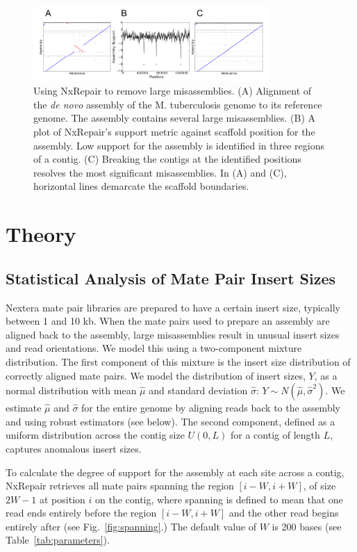 \begin{figure}
\centerline{\includegraphics[width=0.8\textwidth]{illumina/fig1_nxrepair.pdf}}
\caption{Using NxRepair to remove large misassemblies. (A) Alignment of the \textit{de novo} assembly of the M. tuberculosis genome to its reference genome. The assembly contains several large misassemblies. (B) A plot of NxRepair's support metric against scaffold position for the assembly. Low support for the assembly is identified in three regions of a contig. (C) Breaking the contigs at the identified positions resolves the most significant misassemblies. In (A) and (C), horizontal lines demarcate the scaffold boundaries.}\label{fig:NxRepair}
\end{figure}

\section{Theory}
\subsection*{Statistical Analysis of Mate Pair Insert Sizes}
Nextera mate pair libraries are prepared to have a certain insert size, typically between 1 and 10 kb. When the mate pairs used to prepare an assembly are aligned back to the assembly, large misassemblies result in unusual insert sizes and read orientations. We model this using a two-component mixture distribution. The first component of this mixture is the insert size distribution of correctly aligned mate pairs.  We model the distribution of insert sizes, $Y$, as a normal distribution with mean $\hat{\mu}$ and standard deviation $\hat{\sigma}$: $Y \sim N(\hat{\mu},\hat{\sigma}^2).$ We estimate $\hat{\mu}$ and $\hat{\sigma}$ for the entire genome by aligning reads back to the assembly and using robust estimators (see below). The second component, defined as a uniform distribution across the contig size $U(0,L)$ for a contig of length $L$, captures anomalous insert sizes. 

To calculate the degree of support for the assembly at each site across a contig, NxRepair retrieves all mate pairs spanning the region $[i-W, i+W]$, of size $2W-1$ at position $i$ on the contig, where spanning is defined to mean that one read ends entirely before the region $[i-W, i+W]$ and the other read begins entirely after (see Fig.~\ref{fig:spanning}.) The default value of $W$ is 200 bases (see Table~\ref{tab:parameters}). 


